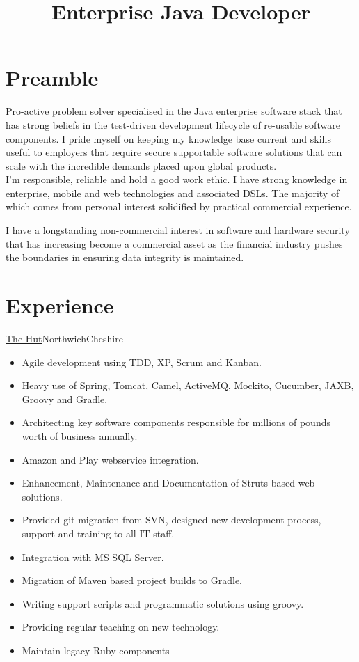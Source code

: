 \documentclass[a4paper,10pt]{moderncv}
\title{Enterprise Java Developer}
\newcommand\weblink[2] {{\color{href} \href{#1}{#2}}}
\begin{document}
\maketitle

\section{Preamble}
Pro-active problem solver specialised in the Java enterprise software stack that has strong beliefs in the test-driven development lifecycle of re-usable software components.
I pride myself on keeping my knowledge base current and skills useful to employers that require secure supportable software solutions that can scale with the incredible demands placed upon global products.\\

I'm responsible, reliable and hold a good work ethic.
I have strong knowledge in enterprise, mobile and web technologies and associated DSLs. The majority of which comes from personal interest solidified by practical commercial experience.

I have a longstanding non-commercial interest in software and hardware security that has increasing become a commercial asset as the financial industry pushes the boundaries in ensuring data integrity is maintained.

\section{Experience}

{\weblink{http://www.thehutgroup.com}{The Hut}}{Northwich}{Cheshire}{
\begin{itemize}
  \item Agile development using TDD, XP, Scrum and Kanban.
  \item Heavy use of Spring, Tomcat, Camel, ActiveMQ, Mockito, Cucumber, JAXB, Groovy and Gradle.
  \item Architecting key software components responsible for millions of pounds worth of business annually.
  \item Amazon and Play webservice integration.
  \item Enhancement, Maintenance and Documentation of Struts based web solutions.
  \item Provided git migration from SVN, designed new development process, support and training to all IT staff.
  \item Integration with MS SQL Server.
  \item Migration of Maven based project builds to Gradle.
  \item Writing support scripts and programmatic solutions using groovy.
  \item Providing regular teaching on new technology.
  \item Maintain legacy Ruby components
\end{itemize}
}
\end{document}
